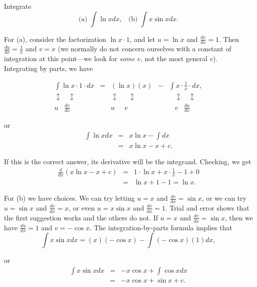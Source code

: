 \begin{example} Integrate
$$
\mbox{(a)}\; \int \ln x dx, \;\;\; \mbox{(b)}\; \int x \sin x dx.
$$

\noindent For (a), consider the factorization $\ln x \cdot 1$, and let $u = \ln x$ and $\frac{dv}{dx} = 1$. 
Then $\frac{du}{dx} = \frac{1}{x}$ and $v = x$ (we normally do not concern ourselves with a constant of integration at this point---we look for \textit{some} $v$, not the most general $v$). Integrating by parts, we have

$$
\begin{array}{ccccl}
            \int \ln x  \cdot  1  \cdot dx &=& (\ln x)(x) &-& \int x \cdot \frac{1}{x} \cdot dx,\\
\updownarrow \;\;\; \updownarrow & &\updownarrow \;\;\;\;\; \updownarrow & & \;\;\;\updownarrow \;\;\;\updownarrow\\
                     u \;\;\; \frac{dv}{dx}   & & u\;\;\;\;\; v & & \;\;\; v \;\;\; \frac{du}{dx}
\end{array}
$$

\noindent or
\begin{eqnarray*}
\int \ln x dx &=& x \ln x - \int dx\\
                  &=& x \ln x - x + c.
\end{eqnarray*}

\noindent If this is the correct answer, its derivative will be the integrand. Checking, we get
 \begin{eqnarray*}
\frac{d}{dx} (x \ln x - x + c) &=& 1 \cdot \ln x+ x \cdot \frac{1}{x} - 1 + 0 \\
                                          &=& \ln x + 1 - 1 = \ln x.
 \end{eqnarray*}

For (b) we have choices. We can try letting $u = x$ and $\frac{dv}{dx} = \sin x$,
or we can try $u = \sin x$ and $\frac{dv}{dx} = x$, or even $u = x \sin x$ and $\frac{dv}{dx} = 1$.  Trial and error shows that the first suggestion works and the others do not. If $u = x$ and $\frac{dv}{dx} = \sin x$, then we have $\frac{du}{dx} = 1$ and $v = -\cos x$. The integration-by-parts formula implies that
$$
\int x \sin x dx = (x)(-\cos x) - \int (-\cos x)(1) dx,
$$

\noindent or
\begin{eqnarray*}
\int x \sin x dx &=& - x \cos x + \int \cos x dx \\
                      &=& -x \cos x + \sin x + c.
\end{eqnarray*}
\end{example}

